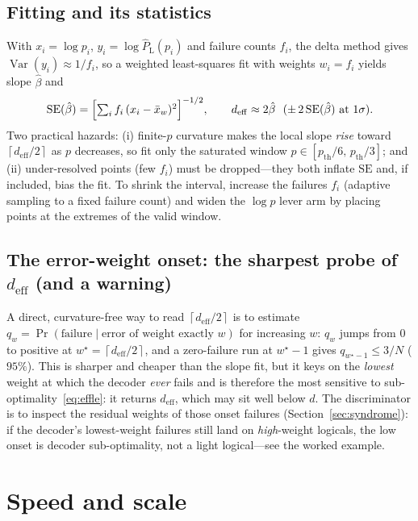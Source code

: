\documentclass[11pt]{article}
\DeclareMathOperator{\Var}{Var}
\newcommand{\PL}{P_{\mathrm{L}}}
\newcommand{\deff}{d_{\mathrm{eff}}}
\newcommand{\ceil}[1]{\left\lceil #1 \right\rceil}
\begin{document}
\subsection{Fitting and its statistics}
With $x_i=\log p_i$, $y_i=\log\widehat\PL(p_i)$ and failure counts $f_i$, the
delta method gives $\Var(y_i)\approx 1/f_i$, so a weighted least-squares fit with
weights $w_i=f_i$ yields slope $\hat\beta$ and
\begin{equation}
  \mathrm{SE}(\hat\beta)=\Bigl[\textstyle\sum_i f_i\,(x_i-\bar x_w)^2\Bigr]^{-1/2},
  \qquad
  \deff\approx 2\hat\beta\ \ (\pm\,2\,\mathrm{SE}(\hat\beta)\ \text{at }1\sigma).
  \label{eq:wls}
\end{equation}
Two practical hazards: (i) finite-$p$ curvature makes the local slope
\emph{rise} toward $\ceil{\deff/2}$ as $p$ decreases, so fit only the saturated
window $p\in[p_{\mathrm{th}}/6,\,p_{\mathrm{th}}/3]$; and (ii) under-resolved
points (few $f_i$) must be dropped---they both inflate $\mathrm{SE}$ and, if
included, bias the fit. To shrink the interval, increase the failures $f_i$
(adaptive sampling to a fixed failure count) and widen the $\log p$ lever arm by
placing points at the extremes of the valid window.

\subsection{The error-weight onset: the sharpest probe of $\deff$ (and a warning)}
\label{sec:onset}
A direct, curvature-free way to read $\ceil{\deff/2}$ is to estimate
$q_w=\Pr(\text{failure}\mid\text{error of weight exactly }w)$ for increasing $w$:
$q_w$ jumps from $0$ to positive at $w^\star=\ceil{\deff/2}$, and a zero-failure
run at $w^\star-1$ gives $q_{w^\star-1}\le 3/N$ ($95\%$). This is sharper and
cheaper than the slope fit, but it keys on the \emph{lowest} weight at which the
decoder \emph{ever} fails and is therefore the most sensitive to
sub-optimality~\eqref{eq:effle}: it returns $\deff$, which may sit well below $d$.
The discriminator is to inspect the residual weights of those onset failures
(Section~\ref{sec:syndrome}): if the decoder's lowest-weight failures still land
on \emph{high}-weight logicals, the low onset is decoder sub-optimality, not a
light logical---see the worked example.

\section{Speed and scale}
\label{sec:speed}
\end{document}
